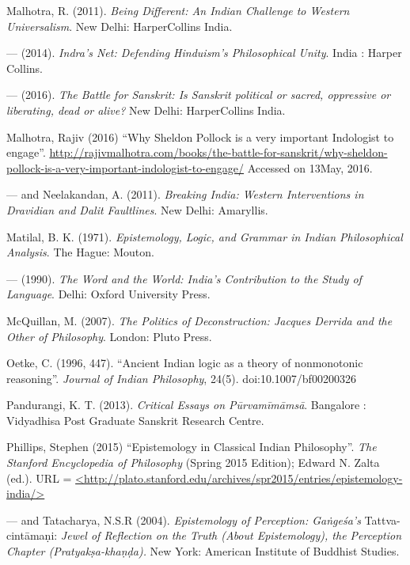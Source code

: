 \begin{thebibliography}{99}
Malhotra, R. (2011). {\sl Being Different: An Indian Challenge to Western Universalism}. New Delhi: HarperCollins  India. 

--- (2014). {\sl Indra's Net: Defending Hinduism's Philosophical Unity}. India : Harper Collins.

--- (2016). {\sl The Battle for Sanskrit: Is Sanskrit political or sacred, oppressive or liberating, dead or alive?} New Delhi: HarperCollins India.

Malhotra, Rajiv  (2016) ``Why Sheldon Pollock is a very important Indologist to engage''. \url{http://rajivmalhotra.com/books/the-battle-for-sanskrit/why-sheldon-pollock-is-a-very-important-indologist-to-engage/} Accessed on 13May, 2016.

--- and Neelakandan, A. (2011). {\sl Breaking India: Western Interventions in Dravidian and Dalit Faultlines}. New Delhi: Amaryllis.

Matilal, B. K. (1971). {\sl Epistemology, Logic, and Grammar in Indian Philosophical Analysis}. The Hague: Mouton.

--- (1990). {\sl The Word and the World: India's Contribution to the Study of Language}. Delhi: Oxford University Press.

McQuillan, M. (2007). {\sl The Politics of Deconstruction: Jacques Derrida and the Other of Philosophy}. London: Pluto Press.

Oetke, C. (1996, 447). ``Ancient Indian logic as a theory of nonmonotonic reasoning''. {\sl Journal of Indian Philosophy}, 24(5). doi:10.1007/bf00200326


Pandurangi, K. T. (2013). {\sl Critical Essays on Pūrvamīmāmsā}. Bangalore : Vidyadhisa Post Graduate Sanskrit Research Centre.

Phillips, Stephen (2015) ``Epistemology in Classical Indian Philosophy''. {\sl The Stanford Encyclopedia of Philosophy} (Spring 2015 Edition); Edward N. Zalta (ed.). URL = \url{<http://plato.stanford.edu/archives/spr2015/entries/epistemology-india/>}

--- and Tatacharya, N.S.R (2004). {\sl Epistemology of Perception: Gaṅgeśa's} Tattva-cintāmaṇi: {\em Jewel of Reflection on the Truth (About Epistemology), the Perception Chapter (Pratyakṣa-khaṇḍa).} New York: American Institute of Buddhist Studies.


\end{thebibliography}
